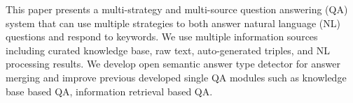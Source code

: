 This paper presents a multi-strategy and multi-source question answering (QA) system that can use multiple strategies to both answer natural language (NL) questions and respond to keywords. We use multiple information sources including curated knowledge base, raw text, auto-generated triples, and NL processing results. We develop open semantic answer type detector for answer merging and improve previous developed single QA modules such as knowledge base based QA, information retrieval based QA.
